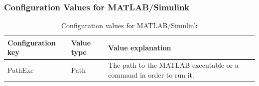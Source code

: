 \subsubsection{Configuration Values for MATLAB/Simulink}
\begin{table}[h]
	\centering
	\begin{tabular}{| l | l | p{10cm} |}
		\hline
		\textbf{Configuration key} & \textbf{Value type} & \textbf{Value explanation} \\ \hline
		
		PathExe & Path & The path to the MATLAB executable or a command in order to run it. \\ \hline
	\end{tabular}
	\caption{Configuration values for MATLAB/Simulink}
\end{table}
